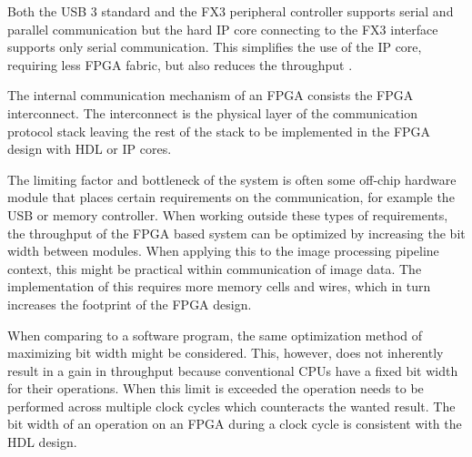 \documentclass[12pt]{report}
\begin{document}
Both the USB 3 standard and the FX3 peripheral controller supports serial and parallel communication but the hard IP core connecting to the FX3 interface supports only serial communication. This simplifies the use of the IP core, requiring less FPGA fabric, but also reduces the throughput \citep{XEM7305Man} \citep{FX3Man}.

\par
The internal communication mechanism of an FPGA consists the FPGA interconnect. The interconnect is the physical layer of the communication protocol stack leaving the rest of the stack to be implemented in the FPGA design with HDL or IP cores. 
\par
The limiting factor and bottleneck of the system is often some off-chip hardware module that places certain requirements on the communication, for example the USB or memory controller. When working outside these types of requirements, the throughput of the FPGA based system can be optimized by increasing the bit width between modules. When applying this to the image processing pipeline context, this might be practical within communication of image data. The implementation of this requires more memory cells and wires, which in turn increases the footprint of the FPGA design.
\par
When comparing to a software program, the same optimization method of maximizing bit width might be considered. This, however, does not inherently result in a gain in throughput because conventional CPUs have a fixed bit width for their operations. When this limit is exceeded the operation needs to be performed across multiple clock cycles which counteracts the wanted result. The bit width of an operation on an FPGA during a clock cycle is consistent with the HDL design. 
\par
\end{document}
